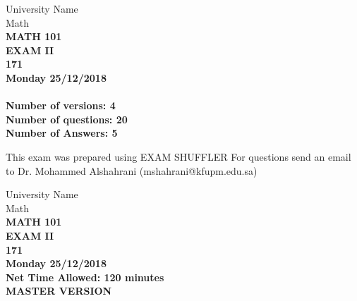 \documentclass[amsfonts,bezier,leqno,fleqn,12pt,a4paper]{article}
\begin{document}
\thispagestyle{empty}
\begin{center}
    \begin{large}
        University Name\\ 
        Math\\ 
        \vspace*{2cm}
        {\bf MATH 101 }  \\
        {\bf EXAM II }  \\
        {\bf 171 }  \\
        {\bf Monday 25/12/2018 }  \\ 

        \vspace*{3cm}
        {\bf{\Huge{}}}\\
        \vspace*{2cm}
        {\bf Number of versions: 4 }  \\
        {\bf Number of questions: 20 }  \\
        {\bf Number of Answers: 5  }  \\
        \vspace*{0.2cm}
    \end{large}

    \vfill

    \tiny{This exam was prepared using EXAM SHUFFLER}
    \tiny{For questions send an email to Dr. Mohammed Alshahrani (mshahrani@kfupm.edu.sa) }
\end{center}



\newpage


\thispagestyle{empty}
\begin{center}
    \begin{large}
        University Name \\
        Math \\
        {\bf MATH 101 } \\ 
        {\bf EXAM II  } \\
        {\bf  171 }  \\
        {\bf Monday 25/12/2018 }  \\ 
        {\bf Net Time Allowed: 120 minutes }  \\
        \vspace*{6cm}
        {\bf {\Huge{MASTER VERSION}}}  \\
    \end{large}
\end{center}
\end{document}
